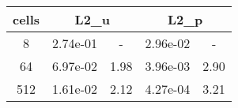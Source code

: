 \documentclass[10pt]{report}
\begin{document}
\begin{table}[H]
\begin{center}
\begin{tabular}{|c|c|c|c|c|} \hline
cells & 
\multicolumn{2}{|c|}{L2_u} & 
\multicolumn{2}{|c|}{L2_p}\\ \hline
8 & 2.74e-01 & - & 2.96e-02 & -\\ \hline
64 & 6.97e-02 & 1.98 & 3.96e-03 & 2.90\\ \hline
512 & 1.61e-02 & 2.12 & 4.27e-04 & 3.21\\ \hline
\end{tabular}
\end{center}
\end{table}
\end{document}
